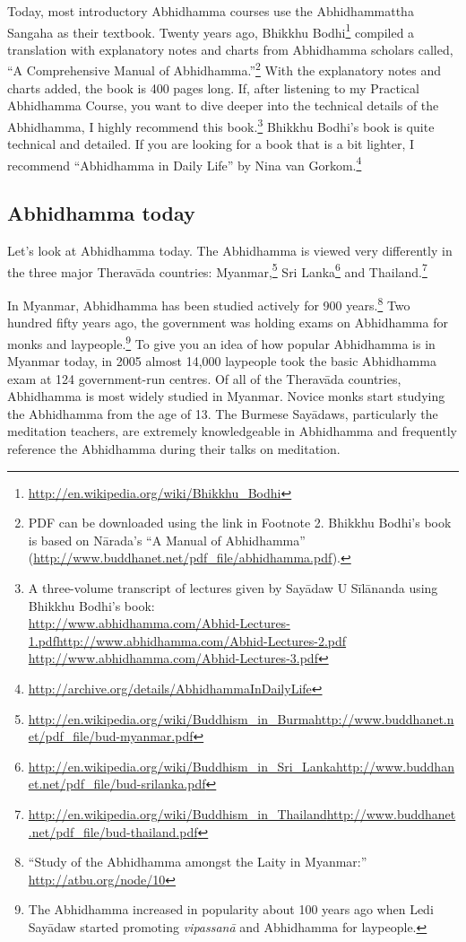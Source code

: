 Today, most introductory Abhidhamma courses use the Abhidhammattha Sangaha as their textbook. Twenty years ago, Bhikkhu Bodhi\footnote{\url{http://en.wikipedia.org/wiki/Bhikkhu_Bodhi}} compiled a translation with explanatory notes and charts from Abhidhamma scholars called, “A Comprehensive Manual of Abhidhamma.”\footnote{PDF can be downloaded using the link in Footnote 2. Bhikkhu Bodhi's book is based on Nārada's “A Manual of Abhidhamma” (\url{http://www.buddhanet.net/pdf_file/abhidhamma.pdf}).} With the explanatory notes and charts added, the book is 400 pages long. If, after listening to my Practical Abhidhamma Course, you want to dive deeper into the technical details of the Abhidhamma, I highly recommend this book.\footnote{A three-volume transcript of lectures given by Sayādaw U Sīlānanda using Bhikkhu Bodhi’s book:\\ \url{http://www.abhidhamma.com/Abhid-Lectures-1.pdf}\linebreak \url{http://www.abhidhamma.com/Abhid-Lectures-2.pdf} \linebreak \url{http://www.abhidhamma.com/Abhid-Lectures-3.pdf}} Bhikkhu Bodhi’s book is quite technical and detailed. If you are looking for a book that is a bit lighter, I recommend “Abhidhamma in Daily Life” by Nina van Gorkom.\footnote{\url{http://archive.org/details/AbhidhammaInDailyLife}}

\subsection*{Abhidhamma today}

Let’s look at Abhidhamma today. The Abhidhamma is viewed very differently in the three major Theravāda countries: Myanmar,\footnote{\url{http://en.wikipedia.org/wiki/Buddhism_in_Burma}\linebreak\url{http://www.buddhanet.net/pdf_file/bud-myanmar.pdf}} Sri Lanka\footnote{\url{http://en.wikipedia.org/wiki/Buddhism_in_Sri_Lanka}\linebreak\url{http://www.buddhanet.net/pdf_file/bud-srilanka.pdf}} and Thailand.\footnote{\url{http://en.wikipedia.org/wiki/Buddhism_in_Thailand}\linebreak\url{http://www.buddhanet.net/pdf_file/bud-thailand.pdf}}

In Myanmar, Abhidhamma has been studied actively for 900 years.\footnote{“Study of the Abhidhamma amongst the Laity in Myanmar:” \url{http://atbu.org/node/10}} Two hundred fifty years ago, the government was holding exams on Abhidhamma for monks and laypeople.\footnote{The Abhidhamma increased in popularity about 100 years ago when Ledi Sayādaw started promoting \textit{vipassanā} and Abhidhamma for laypeople.} To give you an idea of how popular Abhidhamma is in Myanmar today, in 2005 almost 14,000 laypeople took the basic Abhidhamma exam at 124 government-run centres. Of all of the Theravāda countries, Abhidhamma is most widely studied in Myanmar. Novice monks start studying the Abhidhamma from the age of 13. The Burmese Sayādaws, particularly the meditation teachers, are extremely knowledgeable in Abhidhamma and frequently reference the Abhidhamma during their talks on meditation.

